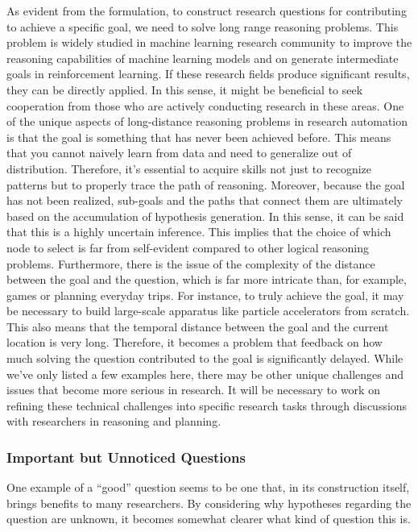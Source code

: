 \documentclass{book}
\begin{document}
As evident from the formulation, to construct research questions for contributing to achieve a specific goal, we need to solve long range reasoning problems. This problem is widely studied in machine learning research community to improve the reasoning capabilities of machine learning models and on generate intermediate goals in reinforcement learning. If these research fields produce significant results, they can be directly applied. In this sense, it might be beneficial to seek cooperation from those who are actively conducting research in these areas. One of the unique aspects of long-distance reasoning problems in research automation is that the goal is something that has never been achieved before. This means that you cannot naively learn from data and need to generalize out of distribution. Therefore, it's essential to acquire skills not just to recognize patterns but to properly trace the path of reasoning. Moreover, because the goal has not been realized, sub-goals and the paths that connect them are ultimately based on the accumulation of hypothesis generation. In this sense, it can be said that this is a highly uncertain inference. This implies that the choice of which node to select is far from self-evident compared to other logical reasoning problems. Furthermore, there is the issue of the complexity of the distance between the goal and the question, which is far more intricate than, for example, games or planning everyday trips. For instance, to truly achieve the goal, it may be necessary to build large-scale apparatus like particle accelerators from scratch. This also means that the temporal distance between the goal and the current location is very long. Therefore, it becomes a problem that feedback on how much solving the question contributed to the goal is significantly delayed. While we've only listed a few examples here, there may be other unique challenges and issues that become more serious in research. It will be necessary to work on refining these technical challenges into specific research tasks through discussions with researchers in reasoning and planning.

\subsubsection{Important but Unnoticed Questions}

One example of a ``good'' question seems to be one that, in its construction itself, brings benefits to many researchers. By considering why hypotheses regarding the question are unknown, it becomes somewhat clearer what kind of question this is.
\end{document}
